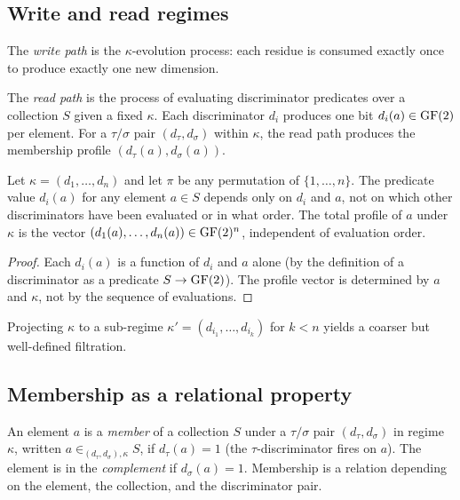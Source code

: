 \subsection{Write and read regimes}\label{sec:write-read}

\begin{definition}
The \emph{write path} is the $\kappa$-evolution process: each
residue is consumed exactly once to produce exactly one new
dimension.
\end{definition}

\begin{definition}
The \emph{read path} is the process of evaluating discriminator
predicates over a collection $S$ given a fixed $\kappa$. Each
discriminator $d_i$ produces one bit $d_i(a) \in \operatorname{GF}(2)$ per
element. For a $\tau/\sigma$ pair $(d_\tau, d_\sigma)$ within
$\kappa$, the read path produces the membership profile
$(d_\tau(a), d_\sigma(a))$.
\end{definition}

\begin{proposition}\label{prop:monoidal}
Let $\kappa = (d_1, \ldots, d_n)$ and let $\pi$ be any permutation
of $\{1, \ldots, n\}$. The predicate value $d_i(a)$ for any
element $a \in S$ depends only on $d_i$ and $a$, not on which
other discriminators have been evaluated or in what order.
The total profile of $a$ under $\kappa$ is the vector
$(d_1(a), \ldots, d_n(a)) \in \operatorname{GF}(2)^n$, independent of
evaluation order.
\end{proposition}

\begin{proof}
Each $d_i(a)$ is a function of $d_i$ and $a$ alone (by the
definition of a discriminator as a predicate $S \to \operatorname{GF}(2)$).
The profile vector is determined by $a$ and $\kappa$, not by
the sequence of evaluations.
\end{proof}

\begin{corollary}
Projecting $\kappa$ to a sub-regime $\kappa' = (d_{i_1}, \ldots, d_{i_k})$
for $k < n$ yields a coarser but well-defined filtration.
\end{corollary}

\subsection{Membership as a relational property}

\begin{definition}[Membership]\label{def:membership}
An element $a$ is a \emph{member} of a collection $S$ under
a $\tau/\sigma$ pair $(d_\tau, d_\sigma)$ in regime $\kappa$,
written $a \in_{(d_\tau, d_\sigma),\kappa} S$,
if $d_\tau(a) = 1$ (the $\tau$-discriminator fires on $a$).
The element is in the \emph{complement} if $d_\sigma(a) = 1$.
Membership is a relation depending on the element, the
collection, and the discriminator pair.
\end{definition}

